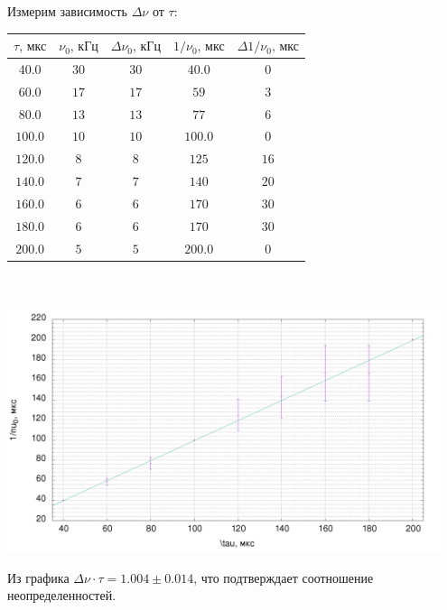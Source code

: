 \documentclass[a4paper,12pt]{article}
\begin{document}
Измерим зависимость $\Delta \nu$ от $\tau$:
\begin{center}
\begin{tabular}{|c|c|c|c|c|}\hline
$\tau\text{, мкс}$&$\nu_0\text{, кГц}$&$\Delta \nu_0\text{, кГц}$&$1/\nu_0\text{, мкс}$&$\Delta 1/\nu_0\text{, мкс}$\\\hline
$40.0$&$30$&$30$&$40.0$&$0$\\\hline
$60.0$&$17$&$17$&$59$&$3$\\\hline
$80.0$&$13$&$13$&$77$&$6$\\\hline
$100.0$&$10$&$10$&$100.0$&$0$\\\hline
$120.0$&$8$&$8$&$125$&$16$\\\hline
$140.0$&$7$&$7$&$140$&$20$\\\hline
$160.0$&$6$&$6$&$170$&$30$\\\hline
$180.0$&$6$&$6$&$170$&$30$\\\hline
$200.0$&$5$&$5$&$200.0$&$0$\\\hline
\end{tabular}\\~\\
\includegraphics[width=0.95\textwidth]{data.png}
\end{center}

Из графика $\Delta \nu \cdot \tau = 1.004\pm0.014$, что подтверждает соотношение неопределенностей.
\end{document}
